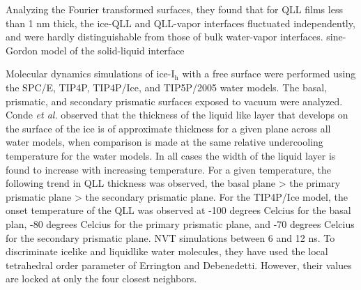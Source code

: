 Analyzing the Fourier transformed surfaces, they found that for QLL
films less than 1 nm thick, the ice-QLL and QLL-vapor interfaces
fluctuated independently, and were hardly distinguishable from those
of bulk water-vapor interfaces. sine-Gordon model of the solid-liquid
interface\cite{20,45}


Molecular dynamics simulations of ice-I$_\mathrm{h}$ with a free
surface were performed using the SPC/E, TIP4P, TIP4P/Ice, and
TIP5P/2005 water models. The basal, prismatic, and secondary prismatic
surfaces exposed to vacuum were analyzed. Conde \textit{et al.}
observed that the thickness of the liquid like layer that develops on
the surface of the ice is of approximate thickness for a given plane
across all water models, when comparison is made at the same relative
undercooling temperature for the water models.\cite{Conde2008} In all cases the width
of the liquid layer is found to increase with increasing
temperature. For a given temperature, the following trend in QLL
thickness was observed, the basal plane > the primary prismatic plane
> the secondary prismatic plane. For the TIP4P/Ice model, the onset
temperature of the QLL was observed at -100 degrees Celcius for the
basal plan, -80 degrees Celcius for the primary prismatic plane, and
-70 degrees Celcius for the secondary prismatic plane. NVT simulations
between 6 and 12 ns. To discriminate icelike and liquidlike water
molecules, they have used the local tetrahedral order parameter of
Errington and Debenedetti. However, their values are locked at only
the four closest neighbors. 


